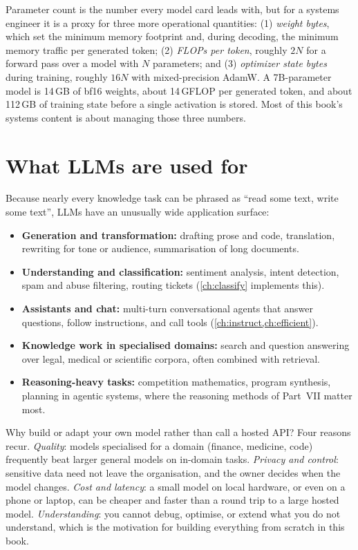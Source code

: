 \begin{systemslens}
Parameter count is the number every model card leads with, but for a systems engineer it is a proxy for
three more operational quantities: (1) \emph{weight bytes}, which set the minimum memory footprint and,
during decoding, the minimum memory traffic per generated token; (2) \emph{FLOPs per token}, roughly
$2N$ for a forward pass over a model with $N$ parameters; and (3) \emph{optimizer state bytes} during
training, roughly $16N$ with mixed-precision AdamW. A 7B-parameter model is 14\,GB of bf16 weights,
about 14\,GFLOP per generated token, and about 112\,GB of training state before a single activation is
stored. Most of this book's systems content is about managing those three numbers.
\end{systemslens}

\section{What LLMs are used for}\label{sec:landscape:apps}

Because nearly every knowledge task can be phrased as ``read some text, write some text'', LLMs have
an unusually wide application surface:
\begin{itemize}
\item \textbf{Generation and transformation:} drafting prose and code, translation, rewriting for
  tone or audience, summarisation of long documents.
\item \textbf{Understanding and classification:} sentiment analysis, intent detection, spam and abuse
  filtering, routing tickets (\cref{ch:classify} implements this).
\item \textbf{Assistants and chat:} multi-turn conversational agents that answer questions, follow
  instructions, and call tools (\cref{ch:instruct,ch:efficient}).
\item \textbf{Knowledge work in specialised domains:} search and question answering over legal,
  medical or scientific corpora, often combined with retrieval.
\item \textbf{Reasoning-heavy tasks:} competition mathematics, program synthesis, planning in agentic
  systems, where the reasoning methods of Part~VII matter most.
\end{itemize}

Why build or adapt your own model rather than call a hosted API? Four reasons recur. \emph{Quality}:
models specialised for a domain (finance, medicine, code) frequently beat larger general models on
in-domain tasks. \emph{Privacy and control}: sensitive data need not leave the organisation, and the
owner decides when the model changes. \emph{Cost and latency}: a small model on local hardware, or even
on a phone or laptop, can be cheaper and faster than a round trip to a large hosted model.
\emph{Understanding}: you cannot debug, optimise, or extend what you do not understand, which is the
motivation for building everything from scratch in this book.

